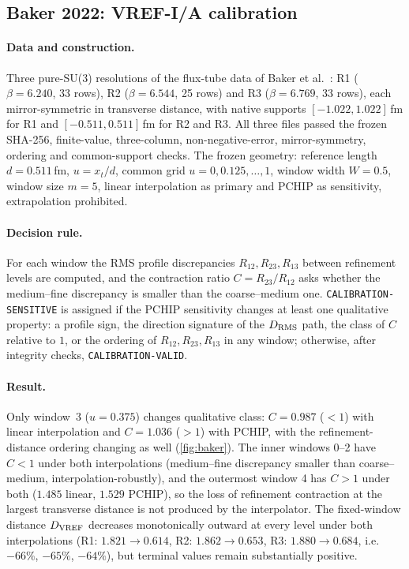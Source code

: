 \documentclass[11pt,a4paper]{article}
\theoremstyle{definition}
\theoremstyle{remark}
\begin{document}
\subsection{Baker 2022: VREF-I/A calibration}\label{ssec:baker}
\paragraph{Data and construction.} Three pure-SU(3) resolutions of the flux-tube data of Baker et al.\ \cite{Baker22}: R1 ($\beta=6.240$, 33 rows), R2 ($\beta=6.544$, 25 rows) and R3 ($\beta=6.769$, 33 rows), each mirror-symmetric in transverse distance, with native supports $[-1.022,1.022]$\,fm for R1 and $[-0.511,0.511]$\,fm for R2 and R3. All three files passed the frozen SHA-256, finite-value, three-column, non-negative-error, mirror-symmetry, ordering and common-support checks. The frozen geometry: reference length $d=0.511$\,fm, $u=x_t/d$, common grid $u=0,0.125,\dots,1$, window width $W=0.5$, window size $m=5$, linear interpolation as primary and PCHIP as sensitivity, extrapolation prohibited.
\paragraph{Decision rule.} For each window the RMS profile discrepancies $R_{12},R_{23},R_{13}$ between refinement levels are computed, and the contraction ratio $C=R_{23}/R_{12}$ asks whether the medium--fine discrepancy is smaller than the coarse--medium one. \texttt{CALIBRATION-\allowbreak{}SENSITIVE} is assigned if the PCHIP sensitivity changes at least one qualitative property: a profile sign, the direction signature of the $D_{\rm RMS}$ path, the class of $C$ relative to $1$, or the ordering of $R_{12},R_{23},R_{13}$ in any window; otherwise, after integrity checks, \texttt{CALIBRATION-\allowbreak{}VALID}.
\paragraph{Result.} Only window~3 ($u=0.375$) changes qualitative class: $C=0.987$ ($<1$) with linear interpolation and $C=1.036$ ($>1$) with PCHIP, with the refinement-distance ordering changing as well (\cref{fig:baker}). The inner windows 0--2 have $C<1$ under both interpolations (medium--fine discrepancy smaller than coarse--medium, interpolation-robustly), and the outermost window 4 has $C>1$ under both ($1.485$ linear, $1.529$ PCHIP), so the loss of refinement contraction at the largest transverse distance is not produced by the interpolator. The fixed-window distance $D_{\rm VREF}$ decreases monotonically outward at every level under both interpolations (R1: $1.821\to0.614$, R2: $1.862\to0.653$, R3: $1.880\to0.684$, i.e.\ $-66\%$, $-65\%$, $-64\%$), but terminal values remain substantially positive.
\end{document}

